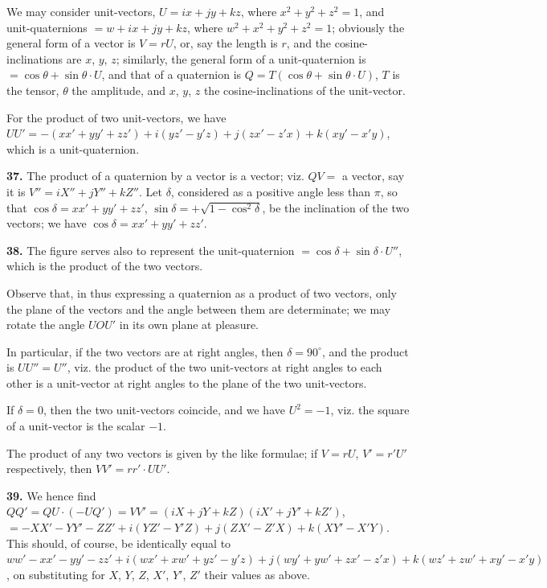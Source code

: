 \documentclass[11pt,a4paper]{book}
\begin{document}
We may consider unit-vectors, $U = ix + jy + kz$, where $x^2 + y^2 + z^2 = 1$, and unit-quaternions $= w + ix + jy + kz$, where $w^2 + x^2 + y^2 + z^2 = 1$; obviously the general form of a vector is $V = rU$, or, say the length is $r$, and the cosine-inclinations are $x$, $y$, $z$; similarly, the general form of a unit-quaternion is $= \cos\theta + \sin\theta \cdot U$, and that of a quaternion is $Q = T(\cos\theta + \sin\theta \cdot U)$, $T$ is the tensor, $\theta$ the amplitude, and $x$, $y$, $z$ the cosine-inclinations of the unit-vector.

For the product of two unit-vectors, we have $UU' = -(xx' + yy' + zz') + i(yz' - y'z) + j(zx' - z'x) + k(xy' - x'y)$, which is a unit-quaternion.

\textbf{37.} The product of a quaternion by a vector is a vector; viz. $QV =$ a vector, say it is $V'' = iX'' + jY'' + kZ''$. Let $\delta$, considered as a positive angle less than $\pi$, so that $\cos\delta = xx' + yy' + zz'$, $\sin\delta = +\sqrt{1 - \cos^2\delta}$, be the inclination of the two vectors; we have $\cos\delta = xx' + yy' + zz'$.

\textbf{38.} The figure serves also to represent the unit-quaternion $= \cos\delta + \sin\delta \cdot U''$, which is the product of the two vectors.

Observe that, in thus expressing a quaternion as a product of two vectors, only the plane of the vectors and the angle between them are determinate; we may rotate the angle $UOU'$ in its own plane at pleasure.

In particular, if the two vectors are at right angles, then $\delta = 90^{\circ}$, and the product is $UU'' = U''$, viz. the product of the two unit-vectors at right angles to each other is a unit-vector at right angles to the plane of the two unit-vectors.

If $\delta = 0$, then the two unit-vectors coincide, and we have $U^2 = -1$, viz. the square of a unit-vector is the scalar $-1$.

The product of any two vectors is given by the like formulae; if $V = rU$, $V' = r'U'$ respectively, then $VV' = rr' \cdot UU'$.

\textbf{39.} We hence find $QQ' = QU \cdot (-UQ') = VV' = (iX + jY + kZ)(iX' + jY' + kZ')$, $= -XX' - YY' - ZZ' + i(YZ' - Y'Z) + j(ZX' - Z'X) + k(XY' - X'Y)$. This should, of course, be identically equal to $ww' - xx' - yy' - zz' + i(wx' + xw' + yz' - y'z) + j(wy' + yw' + zx' - z'x) + k(wz' + zw' + xy' - x'y)$, on substituting for $X$, $Y$, $Z$, $X'$, $Y'$, $Z'$ their values as above.
\end{document}
